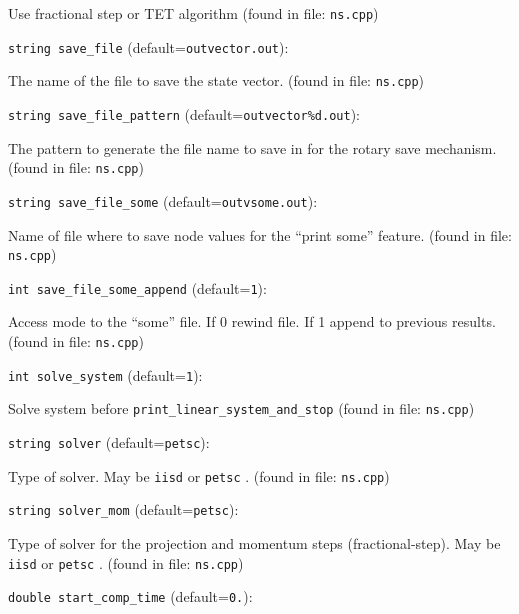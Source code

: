 Use fractional step or TET algorithm
 (found in file: \verb+ns.cpp+)
\item\verb+string save_file+ {\rm(default=\verb|outvector.out|)}:

The name of the file to save the state vector. 
 (found in file: \verb+ns.cpp+)
\item\verb+string save_file_pattern+ {\rm(default=\verb|outvector%d.out|)}:

The pattern to generate the file name to save in for
the rotary save mechanism.
 (found in file: \verb+ns.cpp+)
\item\verb+string save_file_some+ {\rm(default=\verb|outvsome.out|)}:

Name of file where to save node values for the ``print some'' 
feature. 
 (found in file: \verb+ns.cpp+)
\item\verb+int save_file_some_append+ {\rm(default=\verb|1|)}:

Access mode to the ``some'' file. If 0 rewind file. If 1 
 append to previous  results.
 (found in file: \verb+ns.cpp+)
\item\verb+int solve_system+ {\rm(default=\verb|1|)}:

Solve system before  \verb+print_linear_system_and_stop+ 
 (found in file: \verb+ns.cpp+)
\item\verb+string solver+ {\rm(default=\verb|petsc|)}:

Type of solver. May be  \verb+iisd+  or  \verb+petsc+ . 
 (found in file: \verb+ns.cpp+)
\item\verb+string solver_mom+ {\rm(default=\verb|petsc|)}:

Type of solver for the projection and momentum steps
(fractional-step). May be  \verb+iisd+  or  \verb+petsc+ .
 (found in file: \verb+ns.cpp+)
\item\verb+double start_comp_time+ {\rm(default=\verb|0.|)}:

